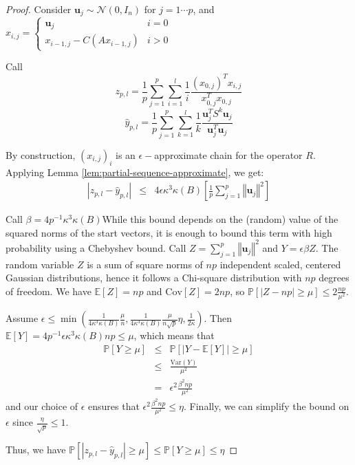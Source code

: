 \begin{proof}

Consider $\mathbf{u}_{j}\sim\mathcal{N}\left(0,I_{n}\right)$ for
$j=1\cdots p$, and $x_{i,j}=\begin{cases}
\mathbf{u}_{j} & i=0\\
x_{i-1,j}-C\left(Ax_{i-1,j}\right) & i>0
\end{cases}$

Call 
\[
z_{p,l}=\frac{1}{p}\sum_{j=1}^{p}\sum_{i=1}^{l}\frac{1}{i}\frac{\left(x_{0,j}\right)^{T}x_{i,j}}{x_{0,j}^{T}x_{0,j}}
\]
\[
\hat{y}_{p,l}=\frac{1}{p}\sum_{j=1}^{p}\sum_{k=1}^{l}\frac{1}{k}\frac{\mathbf{u}_{j}^{T}S^{k}\mathbf{u}_{j}}{\mathbf{u}_{j}^{T}\mathbf{u}_{j}}
\]


By construction, $\left(x_{i,j}\right)_{i}$ is an $\epsilon-$approximate
chain for the operator $R$. Applying Lemma \ref{lem:partial-sequence-approximate},
we get:
\begin{eqnarray*}
\left|z_{p,l}-\hat{y}_{p,l}\right| & \leq & 4\epsilon\kappa^{3}\kappa\left(B\right)\left[\frac{1}{p}\sum_{j=1}^{p}\left\Vert \mathbf{u}_{j}\right\Vert ^{2}\right]
\end{eqnarray*}


Call $\beta=4p^{-1}\kappa^{3}\kappa\left(B\right)$While this bound
depends on the (random) value of the squared norms of the start vectors,
it is enough to bound this term with high probability using a Chebyshev
bound. Call $Z=\sum_{j=1}^{p}\left\Vert \mathbf{u}_{j}\right\Vert ^{2}$
and $Y=\epsilon\beta Z$. The random variable $Z$ is a sum of square
norms of $np$ independent scaled, centered Gaussian distributions,
hence it follows a Chi-square distribution with $np$ degrees of freedom.
We have $\mathbb{E}\left[Z\right]=np$ and $\text{Cov}\left[Z\right]=2np$,
so $\mathbb{P}\left[\left|Z-np\right|\geq\mu\right]\leq2\frac{np}{\mu^{2}}$.

Assume $\epsilon\leq\min\left(\frac{1}{4\kappa^{3}\kappa\left(B\right)}\frac{\mu}{n},\frac{1}{4\kappa^{3}\kappa\left(B\right)}\frac{\mu}{n\sqrt{p}}\eta,\frac{1}{2\kappa}\right)$.
Then $\mathbb{E}\left[Y\right]=4p^{-1}\epsilon\kappa^{3}\kappa\left(B\right)np\leq\mu$,
which means that 
\begin{eqnarray*}
\mathbb{P}\left[Y\geq\mu\right] & \leq & \mathbb{P}\left[\left|Y-\mathbb{E}\left[Y\right]\right|\geq\mu\right]\\
 & \leq & \frac{\text{Var}\left(Y\right)}{\mu^{2}}\\
 & = & \epsilon^{2}\frac{\beta^{2}np}{\mu^{2}}
\end{eqnarray*}
and our choice of $\epsilon$ ensures that $\epsilon^{2}\frac{\beta^{2}np}{\mu^{2}}\leq\eta$.
Finally, we can simplify the bound on $\epsilon$ since $\frac{\eta}{\sqrt{p}}\le1$.

Thus, we have $\mathbb{P}\left[\left|z_{p,l}-\hat{y}_{p,l}\right|\geq\mu\right]\leq\mathbb{P}\left[Y\geq\mu\right]\leq\eta$

\end{proof}
